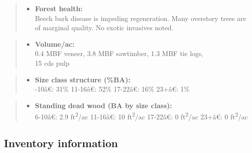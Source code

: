 \documentclass[]{tufte-handout}
\newcommand{\euro}{€}
\providecommand{\tightlist}{%
  \setlength{\itemsep}{0pt}\setlength{\parskip}{0pt}}
\begin{document}
\begin{quote}
\begin{itemize}
\tightlist
\item
  \textbf{Forest health:}\\
  \vspace{2pt} Beech bark disease is impeding regeneration. Many
  overstory trees are of marginal quality. No exotic invasives noted.
\end{itemize}
\end{quote}

\begin{quote}
\begin{itemize}
\tightlist
\item
  \textbf{Volume/ac:}\\
  \vspace{2pt} 0.4 MBF veneer, 3.8 MBF sawtimber, 1.3 MBF tie logs,\\
  15 cds pulp
\end{itemize}
\end{quote}

\begin{quote}
\begin{itemize}
\tightlist
\item
  \textbf{Size class structure (\%BA):}\\
  \vspace{2pt} -10â\euro{}: 31\% \textbar{} 11-16â\euro{}:
  52\% \textbar{} 17-22â\euro{}: 16\% \textbar{} 23+â\euro{}: 1\%
\end{itemize}
\end{quote}

\begin{quote}
\begin{itemize}
\tightlist
\item
  \textbf{Standing dead wood (BA by size class):}\\
  \vspace{2pt} 6-10â\euro{}: 2.9 ft\textsuperscript{2}/ac \textbar{}
  11-16â\euro{}: 10 ft\textsuperscript{2}/ac \textbar{} 17-22â\euro{}:
  0 ft\textsuperscript{2}/ac \textbar{} 23+â\euro{}: 0
  ft\textsuperscript{2}/ac
\end{itemize}
\end{quote}

\subsection{Inventory information}\label{inventory-information-5}
\end{document}

